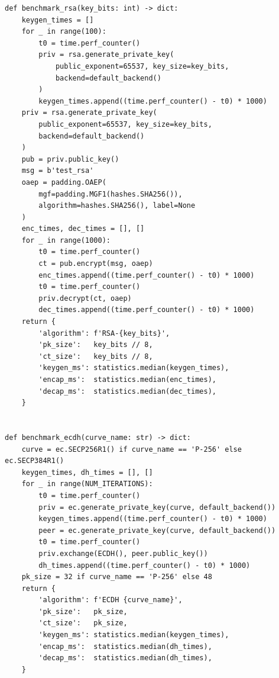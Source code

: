 \documentclass[a4paper,14pt]{extreport}
\begin{document}
\begin{latin}
\begin{verbatim}
def benchmark_rsa(key_bits: int) -> dict:
    keygen_times = []
    for _ in range(100):
        t0 = time.perf_counter()
        priv = rsa.generate_private_key(
            public_exponent=65537, key_size=key_bits,
            backend=default_backend()
        )
        keygen_times.append((time.perf_counter() - t0) * 1000)
    priv = rsa.generate_private_key(
        public_exponent=65537, key_size=key_bits,
        backend=default_backend()
    )
    pub = priv.public_key()
    msg = b'test_rsa'
    oaep = padding.OAEP(
        mgf=padding.MGF1(hashes.SHA256()),
        algorithm=hashes.SHA256(), label=None
    )
    enc_times, dec_times = [], []
    for _ in range(1000):
        t0 = time.perf_counter()
        ct = pub.encrypt(msg, oaep)
        enc_times.append((time.perf_counter() - t0) * 1000)
        t0 = time.perf_counter()
        priv.decrypt(ct, oaep)
        dec_times.append((time.perf_counter() - t0) * 1000)
    return {
        'algorithm': f'RSA-{key_bits}',
        'pk_size':   key_bits // 8,
        'ct_size':   key_bits // 8,
        'keygen_ms': statistics.median(keygen_times),
        'encap_ms':  statistics.median(enc_times),
        'decap_ms':  statistics.median(dec_times),
    }


def benchmark_ecdh(curve_name: str) -> dict:
    curve = ec.SECP256R1() if curve_name == 'P-256' else ec.SECP384R1()
    keygen_times, dh_times = [], []
    for _ in range(NUM_ITERATIONS):
        t0 = time.perf_counter()
        priv = ec.generate_private_key(curve, default_backend())
        keygen_times.append((time.perf_counter() - t0) * 1000)
        peer = ec.generate_private_key(curve, default_backend())
        t0 = time.perf_counter()
        priv.exchange(ECDH(), peer.public_key())
        dh_times.append((time.perf_counter() - t0) * 1000)
    pk_size = 32 if curve_name == 'P-256' else 48
    return {
        'algorithm': f'ECDH {curve_name}',
        'pk_size':   pk_size,
        'ct_size':   pk_size,
        'keygen_ms': statistics.median(keygen_times),
        'encap_ms':  statistics.median(dh_times),
        'decap_ms':  statistics.median(dh_times),
    }



\end{verbatim}
\end{latin}
\end{document}
